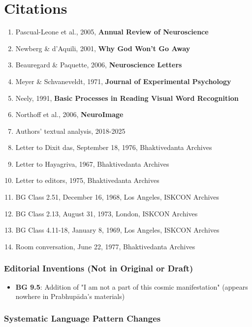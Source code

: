 \documentclass[11pt,twoside]{book}
\begin{document}
\part*{Citations}
\label{sec:orgadfd221}
\thispagestyle{plain}

\begin{enumerate}
\item Pascual-Leone et al., 2005, \textbf{Annual Review of Neuroscience}
\item Newberg \& d'Aquili, 2001, \textbf{Why God Won't Go Away}
\item Beauregard \& Paquette, 2006, \textbf{Neuroscience Letters}
\item Meyer \& Schvaneveldt, 1971, \textbf{Journal of Experimental Psychology}
\item Neely, 1991, \textbf{Basic Processes in Reading Visual Word Recognition}
\item Northoff et al., 2006, \textbf{NeuroImage}
\item Authors' textual analysis, 2018-2025
\item Letter to Dixit das, September 18, 1976, Bhaktivedanta Archives
\item Letter to Hayagriva, 1967, Bhaktivedanta Archives
\item Letter to editors, 1975, Bhaktivedanta Archives
\item BG Class 2.51, December 16, 1968, Los Angeles, ISKCON Archives
\item BG Class 2.13, August 31, 1973, London, ISKCON Archives
\item BG Class 4.11-18, January 8, 1969, Los Angeles, ISKCON Archives
\item Room conversation, June 22, 1977, Bhaktivedanta Archives
\end{enumerate}
\section*{Editorial Inventions (Not in Original or Draft)}
\label{sec:org2d8b02c}
\begin{itemize}
\item \textbf{\textbf{BG 9.5}}: Addition of "I am not a part of this cosmic manifestation" (appears nowhere in Prabhupāda's materials)
\end{itemize}
\section*{Systematic Language Pattern Changes}
\label{sec:org3876095}
\end{document}
